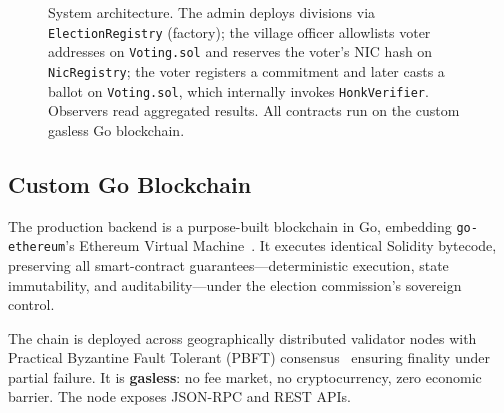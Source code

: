\documentclass[conference]{IEEEtran}
\theoremstyle{definition}
\theoremstyle{plain}
\begin{document}
\begin{figure}[t]
\caption{System architecture. The admin deploys divisions via \texttt{ElectionRegistry} (factory); the village officer allowlists voter addresses on \texttt{Voting.sol} and reserves the voter's NIC hash on \texttt{NicRegistry}; the voter registers a commitment and later casts a ballot on \texttt{Voting.sol}, which internally invokes \texttt{HonkVerifier}. Observers read aggregated results. All contracts run on the custom gasless Go blockchain.}
\label{fig:arch}
\end{figure}

\subsection{Custom Go Blockchain}
The production backend is a purpose-built blockchain in Go, embedding \texttt{go-ethereum}'s Ethereum Virtual Machine~\cite{ethereum2014}. It executes identical Solidity bytecode, preserving all smart-contract guarantees---deterministic execution, state immutability, and auditability---under the election commission's sovereign control.

The chain is deployed across geographically distributed validator nodes with Practical Byzantine Fault Tolerant (PBFT) consensus~\cite{pbft1999} ensuring finality under partial failure. It is \textbf{gasless}: no fee market, no cryptocurrency, zero economic barrier. The node exposes JSON-RPC and REST APIs.
\end{document}
